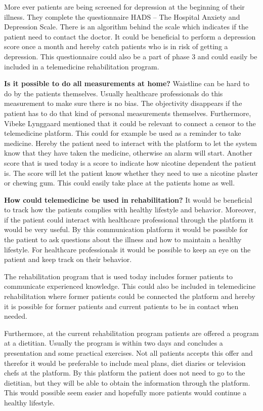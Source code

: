 More ever patients are being screened for depression at the beginning of their illness. They complete the questionnaire HADS – The Hospital Anxiety and Depression Scale. There is an algorithm behind the scale which indicates if the patient need to contact the doctor. It could be beneficial to perform a depression score once a month and hereby catch patients who is in risk of getting a depression. This questionnaire could also be a part of phase 3 and could easily be included in a telemedicine rehabilitation program. 

\textbf{Is it possible to do all measurements at home?} \newline 
Waistline can be hard to do by the patients themselves. Usually healthcare professionals do this measurement to make sure there is no bias. The objectivity disappears if the patient has to do that kind of personal measurements themselves. Furthermore, Vibeke Lynggaard mentioned that it could be relevant to connect a censor to the telemedicine platform. This could for example be used as a reminder to take medicine. Hereby the patient need to interact with the platform to let the system know that they have taken the medicine, otherwise an alarm will start. Another score that is used today is a score to indicate how nicotine dependent the patient is. The score will let the patient know whether they need to use a nicotine plaster or chewing gum. This could easily take place at the patients home as well. 

\textbf{How could telemedicine be used in rehabilitation?} \newline 
It would be beneficial to track how the patients complies with healthy lifestyle and behavior. Moreover, if the patient could interact with healthcare professional through the platform it would be very useful. By this communication platform it would be possible for the patient to ask questions about the illness and how to maintain a healthy lifestyle. For healthcare professionals it would be possible to keep an eye on the patient and keep track on their behavior. 

The rehabilitation program that is used today includes former patients to communicate experienced knowledge. This could also be included in telemedicine rehabilitation where former patients could be connected the platform and hereby it is possible for former patients and current patients to be in contact when needed.   

Furthermore, at the current rehabilitation program patients are offered a program at a dietitian. Usually the program is within two days and concludes a presentation and some practical exercises. Not all patients accepts this offer and therefor it would be preferable to include meal plans, diet diaries or television chefs at the platform. By this platform the patient does not need to go to the dietitian, but they will be able to obtain the information through the platform. This would possible seem easier and hopefully more patients would continue a healthy lifestyle. 

